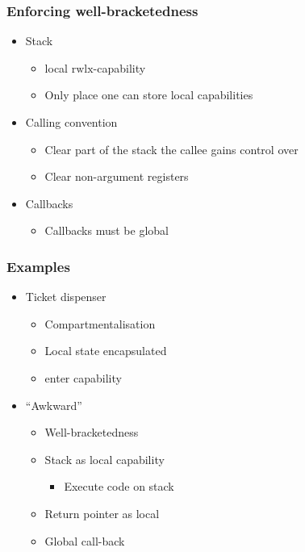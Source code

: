 \documentclass[handout]{beamer}
\newcommand{\plainperm}[1]{\mathrm{#1}}
\newcommand{\rwlx}{\plainperm{rwlx}}
\begin{document}
\begin{frame}
  \frametitle{Enforcing well-bracketedness}
  \begin{itemize}
  \item Stack
    \begin{itemize}
    \item local $\rwlx$-capability
    \item Only place one can store local capabilities
    \end{itemize}
  \item Calling convention
    \begin{itemize}
    \item Clear part of the stack the callee gains control over
    \item Clear non-argument registers 
    \end{itemize}
  \item Callbacks
    \begin{itemize}
    \item Callbacks must be global
    \end{itemize}
  \end{itemize}
\end{frame}

\begin{frame}
  \frametitle{Examples}
  \begin{itemize}
  \item Ticket dispenser
    \begin{itemize}
    \item Compartmentalisation
    \item Local state encapsulated
    \item enter capability
    \end{itemize}
  \item ``Awkward'' %
    \begin{itemize}
    \item Well-bracketedness
    \item Stack as local capability
      \begin{itemize}
      \item Execute code on stack
      \end{itemize}
    \item Return pointer as local
    \item Global call-back
    \end{itemize}
  \end{itemize}
\end{frame}
\end{document}
